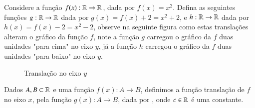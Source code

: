  \begin{exem}
  Considere a função $f(x): \mathbb{R} \to \mathbb{R}$, dada por $f(x)= x^2$. Defina as seguintes funções $g: \mathbb{R} \to \mathbb{R}$ dada por $g(x)= f(x) + 2= x^2 + 2$, e $h: \mathbb{R} \to \mathbb{R}$ dada por $h(x)= f(x) - 2= x^2 - 2$, observe na seguinte figura como estas translações alteram o gráfico da função $f$, note a função $g$ carregou o gráfico da $f$ duas unidades "para cima" no eixo $y$, já a função $h$ carregou o gráfico da $f$ duas unidades "para baixo" no eixo $y$.
  
 \begin{figure}[H]
\caption{Translação no eixo $y$}
  \end{figure}
  
 \end{exem}

  Dados $A, B \subset \mathbb{R}$ e uma função $f(x): A \to B$, definimos a função translação de $f$ no eixo $x$, pela função $g(x): A \to B$, dada por , onde $c \in \mathbb{R}$ é uma constante.
 
